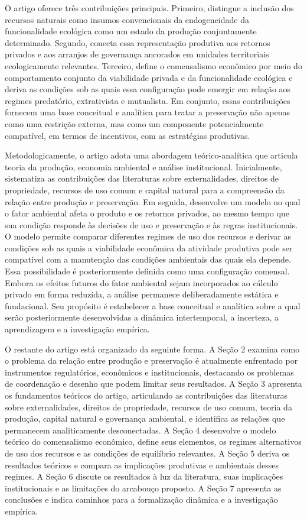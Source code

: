 O artigo oferece três contribuições principais. Primeiro, distingue a inclusão dos recursos naturais como insumos convencionais da endogeneidade da funcionalidade ecológica como um estado da produção conjuntamente determinado. Segundo, conecta essa representação produtiva aos retornos privados e aos arranjos de governança ancorados em unidades territoriais ecologicamente relevantes. Terceiro, define o comensalismo econômico por meio do comportamento conjunto da viabilidade privada e da funcionalidade ecológica e deriva as condições sob as quais essa configuração pode emergir em relação aos regimes predatório, extrativista e mutualista. Em conjunto, essas contribuições fornecem uma base conceitual e analítica para tratar a preservação não apenas como uma restrição externa, mas como um componente potencialmente compatível, em termos de incentivos, com as estratégias produtivas.

Metodologicamente, o artigo adota uma abordagem teórico-analítica que articula teoria da produção, economia ambiental e análise institucional. Inicialmente, sistematiza as contribuições das literaturas sobre externalidades, direitos de propriedade, recursos de uso comum e capital natural para a compreensão da relação entre produção e preservação. Em seguida, desenvolve um modelo no qual o fator ambiental afeta o produto e os retornos privados, ao mesmo tempo que sua condição responde às decisões de uso e preservação e às regras institucionais. O modelo permite comparar diferentes regimes de uso dos recursos e derivar as condições sob as quais a viabilidade econômica da atividade produtiva pode ser compatível com a manutenção das condições ambientais das quais ela depende. Essa possibilidade é posteriormente definida como uma configuração comensal. Embora os efeitos futuros do fator ambiental sejam incorporados ao cálculo privado em forma reduzida, a análise permanece deliberadamente estática e fundacional. Seu propósito é estabelecer a base conceitual e analítica sobre a qual serão posteriormente desenvolvidas a dinâmica intertemporal, a incerteza, a aprendizagem e a investigação empírica.

O restante do artigo está organizado da seguinte forma. A Seção 2 examina como o problema da relação entre produção e preservação é atualmente enfrentado por instrumentos regulatórios, econômicos e institucionais, destacando os problemas de coordenação e desenho que podem limitar seus resultados. A Seção 3 apresenta os fundamentos teóricos do artigo, articulando as contribuições das literaturas sobre externalidades, direitos de propriedade, recursos de uso comum, teoria da produção, capital natural e governança ambiental, e identifica as relações que permanecem analiticamente desconectadas. A Seção 4 desenvolve o modelo teórico do comensalismo econômico, define seus elementos, os regimes alternativos de uso dos recursos e as condições de equilíbrio relevantes. A Seção 5 deriva os resultados teóricos e compara as implicações produtivas e ambientais desses regimes. A Seção 6 discute os resultados à luz da literatura, suas implicações institucionais e as limitações do arcabouço proposto. A Seção 7 apresenta as conclusões e indica caminhos para a formalização dinâmica e a investigação empírica.

